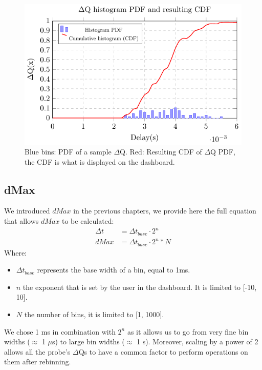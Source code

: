     \begin{figure}[H]
            \begin{center}
                \includegraphics[scale=1]{tikz/pdf_dq.pdf} 
            \end{center}
            \caption{Blue bins: PDF of a sample $\Delta$Q. Red: Resulting CDF of $\Delta$Q PDF, the CDF is what is displayed on the dashboard.}
        \end{figure}

    \subsection{dMax}
        We introduced $dMax$ in the previous chapters, we provide here the full equation that allows $dMax$ to be calculated:
        \begin{equation}
            \begin{split}
                \Delta t &= \Delta t_{base} \cdot 2^n \\ 
                dMax &= \Delta t_{base} \cdot 2^n * N  
            \end{split}
            \label{eq:dMaxU}
        \end{equation}
        Where:
        \begin{itemize}
            \item $\Delta t_{base}$ represents the base width of a bin, equal to 1ms.
            \item $n$ the exponent that is set by the user in the dashboard. It is limited to [-10, 10].
            \item $N$ the number of bins, it is limited to [1, 1000].
        \end{itemize}
            We chose 1 ms in combination with $2^n$ as it allows us to go from very fine bin widths ($\approx$ 1 $\mu$s) to large bin widths ($\approx$ 1 s). Moreover, scaling by a power of 2 allows all the probe's $\Delta$Qs to have a common factor to perform operations on them after rebinning.


